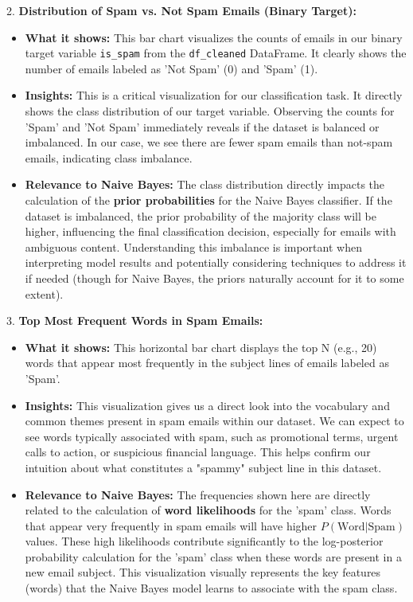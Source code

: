 \documentclass[12pt,a4paper]{article}
\begin{document}
2.  \textbf{Distribution of Spam vs. Not Spam Emails (Binary Target):}
\begin{itemize}
    \item \textbf{What it shows:} This bar chart visualizes the counts of emails in our binary target variable \texttt{is\_spam} from the \texttt{df\_cleaned} DataFrame. It clearly shows the number of emails labeled as 'Not Spam' (0) and 'Spam' (1).
    \item \textbf{Insights:} This is a critical visualization for our classification task. It directly shows the class distribution of our target variable. Observing the counts for 'Spam' and 'Not Spam' immediately reveals if the dataset is balanced or imbalanced. In our case, we see there are fewer spam emails than not-spam emails, indicating class imbalance.
    \item \textbf{Relevance to Naive Bayes:} The class distribution directly impacts the calculation of the \textbf{prior probabilities} for the Naive Bayes classifier. If the dataset is imbalanced, the prior probability of the majority class will be higher, influencing the final classification decision, especially for emails with ambiguous content. Understanding this imbalance is important when interpreting model results and potentially considering techniques to address it if needed (though for Naive Bayes, the priors naturally account for it to some extent).
\end{itemize}

3.  \textbf{Top Most Frequent Words in Spam Emails:}
\begin{itemize}
    \item \textbf{What it shows:} This horizontal bar chart displays the top N (e.g., 20) words that appear most frequently in the subject lines of emails labeled as 'Spam'.
    \item \textbf{Insights:} This visualization gives us a direct look into the vocabulary and common themes present in spam emails within our dataset. We can expect to see words typically associated with spam, such as promotional terms, urgent calls to action, or suspicious financial language. This helps confirm our intuition about what constitutes a "spammy" subject line in this dataset.
    \item \textbf{Relevance to Naive Bayes:} The frequencies shown here are directly related to the calculation of \textbf{word likelihoods} for the 'spam' class. Words that appear very frequently in spam emails will have higher $P(\text{Word} | \text{Spam})$ values. These high likelihoods contribute significantly to the log-posterior probability calculation for the 'spam' class when these words are present in a new email subject. This visualization visually represents the key features (words) that the Naive Bayes model learns to associate with the spam class.
\end{itemize}
\end{document}
